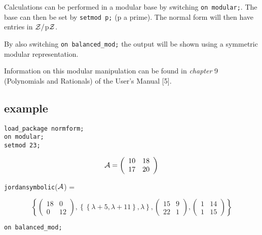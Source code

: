 Calculations can be performed in a modular base by switching {\tt on
modular;}. The base can then be set by {\tt setmod p;} (p a prime). The
normal form will then have entries in ${\cal Z}/$p${\cal Z}$.

By also switching {\tt on balanced\_mod;} the output will be shown using
a symmetric modular representation.

Information on this modular manipulation can be found in {\it chapter}
9 (Polynomials and Rationals) of the {\REDUCE}  User's Manual [5].

\subsection{example}

{\tt load\_package normform;} \\
{\tt on modular;} \\
{\tt setmod 23;}
\vspace{0.1in}

\begin{displaymath}
{\cal A} = \left( \begin{array}{cc} 10 & 18 \\ 17 & 20 \end{array}
\right)
\end{displaymath}

{\tt jordansymbolic}(${\cal A}$) =
\begin{center}
\begin{displaymath}
\left\{ \left( \begin{array}{cc} 18 & 0 \\ 0 & 12 \end{array} \right),
\left\{ \left\{ \lambda + 5, \lambda + 11  \right\}, \lambda \right\},
\left( \begin{array}{cc} 15 & 9 \\ 22 & 1 \end{array} \right), \left(
\begin{array}{cc} 1 & 14 \\ 1 & 15 \end{array} \right) \right\}
\end{displaymath}
\end{center}
\vspace{0.2in}

{\tt on balanced\_mod;}
\vspace{0.2in}


